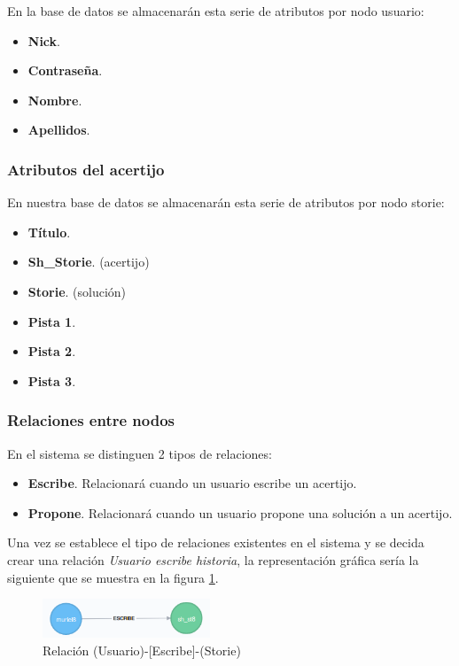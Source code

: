 En la base de datos se almacenarán esta serie de atributos por nodo usuario:

\begin{itemize}
    \item \textbf{Nick}.
    \item \textbf{Contraseña}.
    \item \textbf{Nombre}.
    \item \textbf{Apellidos}.
\end{itemize}


\subsubsection{Atributos del acertijo}
En nuestra base de datos se almacenarán esta serie de atributos por nodo storie:

\begin{itemize}
    \item \textbf{Título}.
    \item \textbf{Sh\_Storie}. (acertijo)
    \item \textbf{Storie}. (solución)
    \item \textbf{Pista 1}.
    \item \textbf{Pista 2}.
    \item \textbf{Pista 3}.
\end{itemize}

\subsubsection{Relaciones entre nodos}

En el sistema se distinguen 2 tipos de relaciones:

\begin{itemize}
    \item \textbf{Escribe}. Relacionará cuando un usuario escribe un acertijo.
    \item \textbf{Propone}. Relacionará cuando un usuario propone una solución a un acertijo.
\end{itemize}

Una vez se establece el tipo de relaciones existentes en el sistema y se decida crear una relación \textit{Usuario escribe historia}, la representación gráfica sería la siguiente que se muestra en la figura \ref{fig::escribe}.

\begin{figure}
     \centerline{\includegraphics[width=5cm]{figuras/escribe.png}}
    \caption{Relación (Usuario)-[Escribe]-(Storie)} 
    \label{fig::escribe}
\end{figure}

